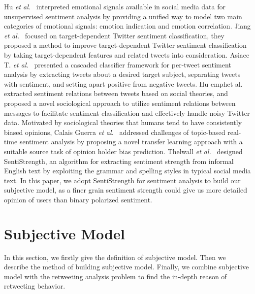 \documentclass{acm_proc_article-sp}
\begin{document}
Hu \emph{et al.}~\cite{Hu:2013www} interpreted emotional signals available in social media data for unsupervised sentiment analysis by providing a unified way to model two main categories of emotional signals: emotion indication and emotion correlation. 
Jiang \emph{et al.}~\cite{Jiang:2011TTS} focused on target-dependent Twitter sentiment classification, they proposed a method to improve target-dependent Twitter sentiment classification by taking target-dependent features and related tweets into consideration. 
Asiaee T. \emph{et al.}~\cite{AsiaeeT:2012} presented a cascaded classifier framework for per-tweet sentiment analysis by extracting tweets about a desired target subject, separating tweets with sentiment, and setting apart positive from negative tweets.
Hu emph{et al.}~\cite{Hu:2013ESR} extracted sentiment relations between tweets based on social theories, and proposed a novel sociological approach to utilize sentiment relations between messages to facilitate sentiment classification and effectively handle noisy Twitter data.
Motivated by sociological theories that humans tend to have consistently biased opinions, Calais Guerra \emph{et al.}~\cite{CalaisGuerra:2011BOT} addressed challenges of topic-based real-time sentiment analysis by proposing a novel transfer learning approach with a suitable source task of opinion holder bias prediction.
Thelwall \emph{et al.}~\cite{Thelwall:2010SSS,Thelwall:2012SSD} designed SentiStrength, an algorithm for extracting sentiment strength from informal English text by exploiting the grammar and spelling styles in typical social media text.
In this paper, we adopt SentiStrength for sentiment analysis to build our subjective model, as a finer grain sentiment strength could give us more detailed opinion of users than binary polarized sentiment.

\section{Subjective Model}
\label{subjectivemodel}
In this section, we firstly give the definition of subjective model. Then we describe the method of building subjective model. Finally, we combine subjective model with the retweeting analysis problem to find the in-depth reason of retweeting behavior.
\end{document}
